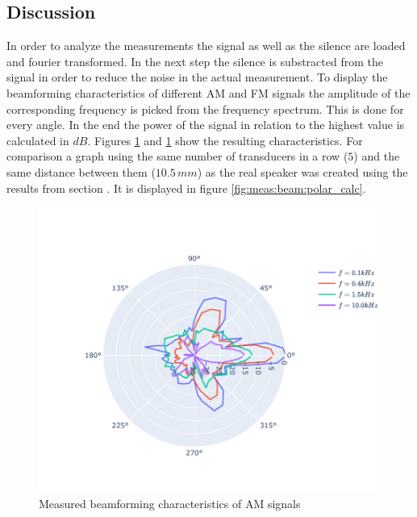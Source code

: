 \subsection{Discussion}
%
In order to analyze the measurements the signal as well as the silence are loaded and fourier transformed. In the next step the silence is substracted from the signal in order to reduce the noise in the actual measurement.\enlargethispage{\baselineskip}\p
To display the beamforming characteristics of different AM and FM signals the amplitude of the corresponding frequency is picked from the frequency spectrum. This is done for every angle. In the end the power of the signal in relation to the highest value is calculated in $dB$. Figures \ref{fig:meas:beam:polar_meas_am} and \ref{fig:meas:beam:polar_meas_am} show the resulting characteristics.\p
For comparison a graph using the same number of transducers in a row ($5$) and the same distance between them ($10.5\,mm$) as the real speaker was created using the results from section . It is displayed in figure \ref{fig:meas:beam:polar_calc}.
%
\begin{figure}
  \centering
  \includegraphics[height=\largeheight]{src/assets/pictures/measurements/beamforming_am_polar.pdf}
  \caption{Measured beamforming characteristics of AM signals}\label{fig:meas:beam:polar_meas_am}
\end{figure}
%
